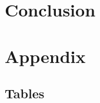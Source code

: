 \documentclass[12pt]{article}
\begin{document}
\section{Conclusion} \label{sec:4}


\newpage



 \label{sec:ref}

\vspace{1.5cm}

\listoffigures

\listoftables

\newpage

\section*{Appendix} \label{sec:A}

\subsection*{Tables}
\end{document}
